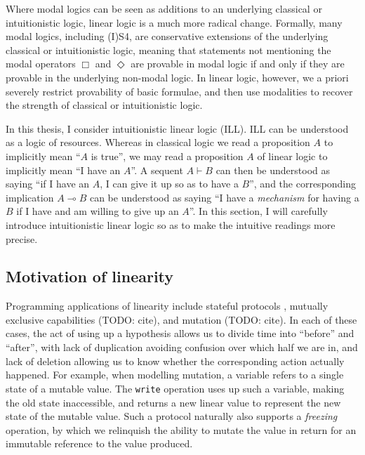 Where modal logics can be seen as additions to an underlying classical or
intuitionistic logic, linear logic is a much more radical change.
Formally, many modal logics, including (I)S4, are conservative extensions of
the underlying classical or intuitionistic logic, meaning that statements not
mentioning the modal operators $\Box$ and $\Diamond$ are provable in modal logic
if and only if they are provable in the underlying non-modal logic.
In linear logic, however, we a priori severely restrict provability of basic
formulae, and then use modalities to recover the strength of classical or
intuitionistic logic.

In this thesis, I consider intuitionistic linear logic (ILL).
ILL can be understood as a logic of resources.
Whereas in classical logic we read a proposition $A$ to implicitly mean ``$A$ is
true'', we may read a proposition $A$ of linear logic to implicitly mean ``I
have an $A$''.
A sequent $A \vdash B$ can then be understood as saying ``if I have an $A$, I
can give it up so as to have a $B$'', and the corresponding implication
$A \multimap B$ can be understood as saying ``I have a \emph{mechanism} for
having a $B$ if I have and am willing to give up an $A$''.
In this section, I will carefully introduce intuitionistic linear logic so as to
make the intuitive readings more precise.


\subsection{Motivation of linearity}

Programming applications of linearity include stateful protocols
\citep{Wadler12}, mutually exclusive capabilities (TODO: cite),
and mutation (TODO: cite).
In each of these cases, the act of using up a hypothesis allows us to divide
time into ``before'' and ``after'', with lack of duplication avoiding confusion
over which half we are in, and lack of deletion allowing us to know whether the
corresponding action actually happened.
For example, when modelling mutation, a variable refers to a single state of a
mutable value.
The \texttt{write} operation uses up such a variable, making the old state
inaccessible, and returns a new linear value to represent the new state of the
mutable value.
Such a protocol naturally also supports a \emph{freezing} operation, by which we
relinquish the ability to mutate the value in return for an immutable reference
to the value produced.

